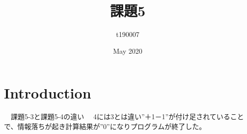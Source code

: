\title{課題5}
\author{t190007 }
\date{May 2020}

\maketitle
\section{Introduction}
　課題5-3と課題5-4の違い
　4には3とは違い”＋1－1”が付け足されていることで、情報落ちが起き計算結果が”0”になりプログラムが終了した。

